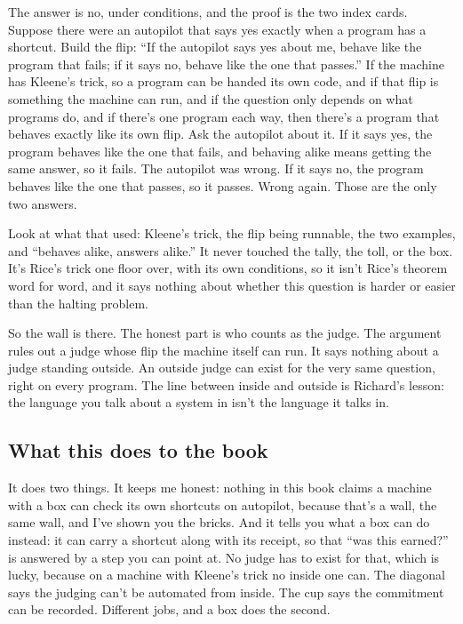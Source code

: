 \documentclass[11pt,twoside]{article}
\theoremstyle{thielethm}
\theoremstyle{thieledef}
\theoremstyle{thieledef}
\theoremstyle{thieledef}
\theoremstyle{thielethm}
\theoremstyle{thieleobs}
\theoremstyle{thielethm}
\begin{document}
The answer is no, under conditions, and the proof is the two index cards. Suppose there were an autopilot that says yes exactly when a program has a shortcut. Build the flip: ``If the autopilot says yes about me, behave like the program that fails; if it says no, behave like the one that passes.'' If the machine has Kleene's trick, so a program can be handed its own code, and if that flip is something the machine can run, and if the question only depends on what programs do, and if there's one program each way, then there's a program that behaves exactly like its own flip. Ask the autopilot about it. If it says yes, the program behaves like the one that fails, and behaving alike means getting the same answer, so it fails. The autopilot was wrong. If it says no, the program behaves like the one that passes, so it passes. Wrong again. Those are the only two answers.

Look at what that used: Kleene's trick, the flip being runnable, the two examples, and ``behaves alike, answers alike.'' It never touched the tally, the toll, or the box. It's Rice's trick one floor over, with its own conditions, so it isn't Rice's theorem word for word, and it says nothing about whether this question is harder or easier than the halting problem.

So the wall is there. The honest part is who counts as the judge. The argument rules out a judge whose flip the machine itself can run. It says nothing about a judge standing outside. An outside judge can exist for the very same question, right on every program. The line between inside and outside is Richard's lesson: the language you talk about a system in isn't the language it talks in.

\subsection{What this does to the book}

It does two things. It keeps me honest: nothing in this book claims a machine with a box can check its own shortcuts on autopilot, because that's a wall, the same wall, and I've shown you the bricks. And it tells you what a box can do instead: it can carry a shortcut along with its receipt, so that ``was this earned?'' is answered by a step you can point at. No judge has to exist for that, which is lucky, because on a machine with Kleene's trick no inside one can. The diagonal says the judging can't be automated from inside. The cup says the commitment can be recorded. Different jobs, and a box does the second.
\end{document}
